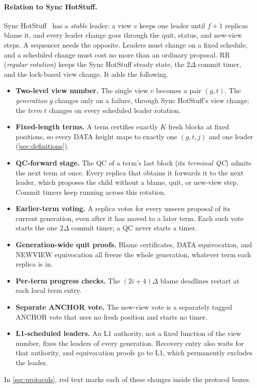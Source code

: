 \documentclass[11pt,a4paper]{article}
\newcommand{\RR}[1]{{\color{rrRed}#1}}
\newcounter{protocol}
\begin{document}
\paragraph{Relation to Sync HotStuff.}
Sync HotStuff~\cite{sync} has a \emph{stable} leader: a view
$v$ keeps one leader until $f+1$ replicas blame it, and every leader
change goes through the quit, status, and new-view steps. A sequencer
needs the opposite. Leaders must change on a fixed schedule, and a
scheduled change must cost no more than an ordinary proposal. RR
(\emph{regular rotation}) keeps the Sync HotStuff steady state, the
$2\Delta$ commit timer, and the lock-based view change. It adds
the following.
\begin{itemize}
\item \textbf{Two-level view number.} The single view $v$ becomes a pair
$(g,t)$. The \emph{generation} $g$ changes only on a failure, through
Sync HotStuff's view change; the \emph{term} $t$ changes on every
scheduled leader rotation.
\item \textbf{Fixed-length terms.} A term certifies exactly $K$ fresh
blocks at fixed positions, so every DATA height maps to exactly one
$(g,t,j)$ and one leader (\cref{sec:definitions}).
\item \textbf{QC-forward stage.} The QC of a term's last block (its
\emph{terminal QC}) admits the next term at once. Every replica that
obtains it forwards it to the next leader, which proposes the child
without a blame, quit, or new-view step. Commit timers keep running
across this rotation.
\item \textbf{Earlier-term voting.} A replica votes for every unseen
proposal of its current generation, even after it has moved to a later
term. Each such vote starts the one $2\Delta$ commit timer; a QC never
starts a timer.
\item \textbf{Generation-wide quit proofs.} Blame certificates, DATA
equivocation, and NEWVIEW equivocation all freeze the whole generation,
whatever term each replica is in.
\item \textbf{Per-term progress checks.} The $(2i+4)\Delta$ blame deadlines
restart at each local term entry.
\item \textbf{Separate ANCHOR vote.} The new-view vote is a separately
tagged ANCHOR vote that uses no fresh position and starts no timer.
\item \textbf{L1-scheduled leaders.} An L1 authority, not a fixed function of the view number,
fixes the leaders of every generation. Recovery entry also waits for that
authority, and equivocation proofs go to L1, which permanently excludes
the leader.
\end{itemize}
In \cref{sec:protocols}, \RR{red text} marks each of these changes inside
the protocol boxes.
\end{document}
